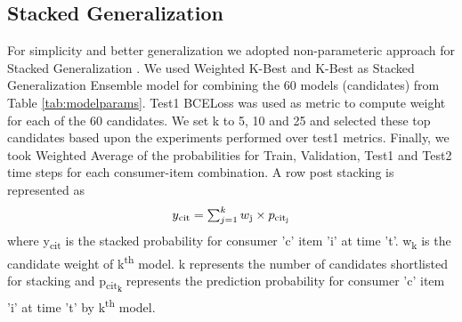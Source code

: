 \subsection{Stacked Generalization}
For simplicity and better generalization we adopted non-parameteric approach for Stacked Generalization \cite{wolpert1992stacked} .
We used Weighted K-Best and K-Best as Stacked Generalization Ensemble model for combining the 60 models (candidates) from Table \ref{tab:modelparams}. 
Test1 BCELoss was used as metric to compute weight for each of the 60 candidates. We set k to 5, 10 and 25 and selected 
these top candidates based upon the experiments performed over test1 metrics. Finally, we took Weighted Average of 
the probabilities for Train, Validation, Test1 and Test2 time steps for each consumer-item combination.
A row post stacking is represented as 
  \begin{equation}
    \begin{array}{l}
      y\textsubscript{cit} =\sum_{j=1}^{k}w\textsubscript{j} \times p\textsubscript{cit\textsubscript{j}}
    \end{array}
    \label{eqn:stack}
  \end{equation}
where y\textsubscript{cit} is the stacked probability for consumer 'c' item ’i’ at time ’t’.
w\textsubscript{k} is the candidate weight of k\textsuperscript{th} model.
k represents the number of candidates shortlisted for stacking and p\textsubscript{cit\textsubscript{k}}
represents the prediction probability for consumer 'c' item ’i’ at time ’t’ by k\textsuperscript{th} model.

